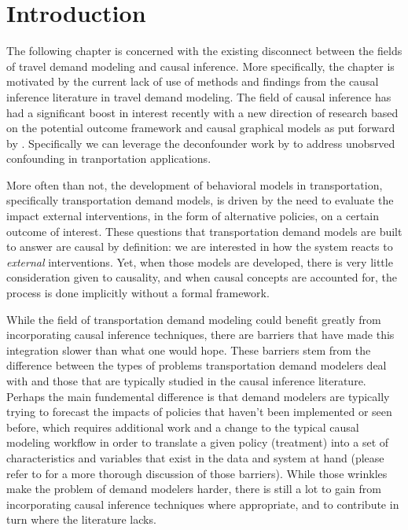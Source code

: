 \section{Introduction}
The following chapter is concerned with the existing disconnect between the 
fields of travel demand modeling and causal inference. More specifically, the 
chapter is motivated by the current lack of use of methods and findings from 
the causal inference literature in travel demand modeling. The field of causal 
inference has had a significant boost in interest recently with a new 
direction of research based on the potential outcome framework and causal 
graphical models as put forward by \citet{pearl_causality_2000}. Specifically we can leverage 
the deconfounder work by \citet{wang_2019_blessings} to address unobsrved confounding in 
tranportation applications.

More often than not, the development of behavioral models in transportation, 
specifically transportation demand models, is driven by the need to evaluate 
the impact external interventions, in the form of alternative policies, on a 
certain outcome of interest. These questions that transportation demand models 
are built to answer are causal by definition: we are interested in how the 
system reacts to \textit{external} interventions. Yet, when those models are 
developed, there is very little consideration given to causality, and when 
causal concepts are accounted for, the process is done implicitly without a 
formal framework. 

While the field of transportation demand modeling could benefit greatly from 
incorporating causal inference techniques, there are barriers that have made 
this integration slower than what one would hope. These barriers stem from 
the difference between the types of problems transportation demand modelers deal with and those that are typically studied in the causal inference literature. Perhaps the main fundemental difference is that demand modelers 
are typically trying to forecast the impacts of policies that haven't been 
implemented or seen before, which requires additional work and a change to the
typical causal modeling workflow in order to translate a given policy 
(treatment) into a set of characteristics and variables that exist in the
data and system at hand (please refer to \citet{brathwaite_2018_causal} for a 
more thorough discussion of those barriers). While those wrinkles make the
problem of demand modelers harder, there is still a lot to gain from 
incorporating causal inference techniques where appropriate, and to contribute
in turn where the literature lacks.  


